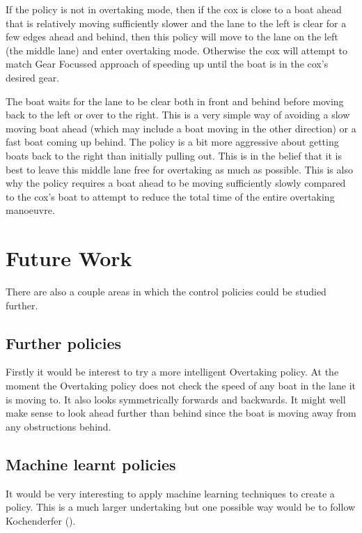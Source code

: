 If the policy is not in overtaking mode, then if the cox is close to a boat ahead that is relatively moving sufficiently slower and the lane to the left is clear for a few edges ahead and behind, then this policy will move to the lane on the left (the middle lane) and enter overtaking mode. Otherwise the cox will attempt to match Gear Focussed approach of speeding up until the boat is in the cox's desired gear.

The boat waits for the lane to be clear both in front and behind before moving back to the left or over to the right. This is a very simple way of avoiding a slow moving boat ahead (which may include a boat moving in the other direction) or a fast boat coming up behind. The policy is a bit more aggressive about getting boats back to the right than initially pulling out. This is in the belief that it is best to leave this middle lane free for overtaking as much as possible. This is also why the policy requires a boat ahead to be moving sufficiently slowly compared to the cox's boat to attempt to reduce the total time of the entire overtaking manoeuvre.





\section{Future Work}
There are also a couple areas in which the control policies could be studied further.

\subsection{Further policies}
Firstly it would be interest to try a more intelligent Overtaking policy. At the moment the Overtaking policy does not check the speed of any boat in the lane it is moving to. It also looks symmetrically forwards and backwards. It might well make sense to look ahead further than behind since the boat is moving away from any obstructions behind.

\subsection{Machine learnt policies}
It would be very interesting to apply machine learning techniques to create a policy. This is a much larger undertaking but one possible way would be to follow Kochenderfer (\cite{Kochenderfer2003}). 

